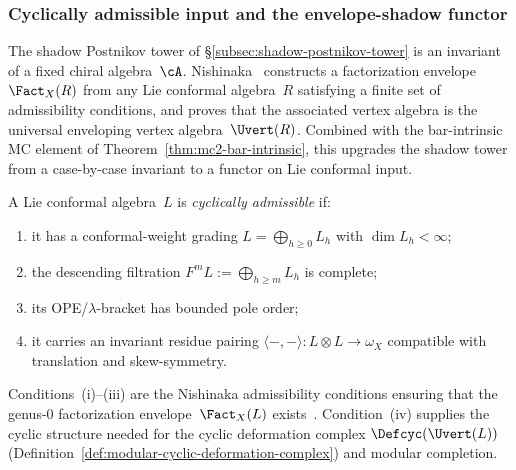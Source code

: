 %

\subsubsection{Cyclically admissible input and the envelope-shadow functor}
\label{subsubsec:envelope-shadow-functor}

The shadow Postnikov tower of
\S\ref{subsec:shadow-postnikov-tower} is an invariant of a
fixed chiral algebra~$\cA$.  Nishinaka~\cite{Nish26} constructs
a factorization envelope $\Fact_X(R)$ from any Lie conformal
algebra~$R$ satisfying a finite set of admissibility conditions,
and proves that the associated vertex algebra is the universal
enveloping vertex algebra~$\Uvert(R)$.  Combined with the
bar-intrinsic MC element of
Theorem~\ref{thm:mc2-bar-intrinsic}, this upgrades the shadow
tower from a case-by-case invariant to a functor on Lie conformal
input.

\begin{definition}
\label{def:cyclically-admissible}
\ClaimStatusProvedHere
{}
A Lie conformal algebra~$L$ is \emph{cyclically admissible} if:
\begin{enumerate}[label=\textup{(\roman*)}]
\item it has a conformal-weight grading
  $L = \bigoplus_{h \geq 0} L_h$ with $\dim L_h < \infty$;
\item the descending filtration
  $F^m L := \bigoplus_{h \geq m} L_h$ is complete;
\item its OPE/$\lambda$-bracket has bounded pole order;
\item it carries an invariant residue pairing
  $\langle{-},{-}\rangle \colon L \otimes L \to \omega_X$
  compatible with translation and skew-symmetry.
\end{enumerate}
Conditions~(i)--(iii) are the Nishinaka admissibility
conditions ensuring that the genus-$0$ factorization
envelope~$\Fact_X(L)$ exists~\cite{Nish26}.
Condition~(iv) supplies the cyclic structure needed for the
cyclic deformation complex
$\Defcyc(\Uvert(L))$
(Definition~\ref{def:modular-cyclic-deformation-complex})
and modular completion.
\end{definition}

